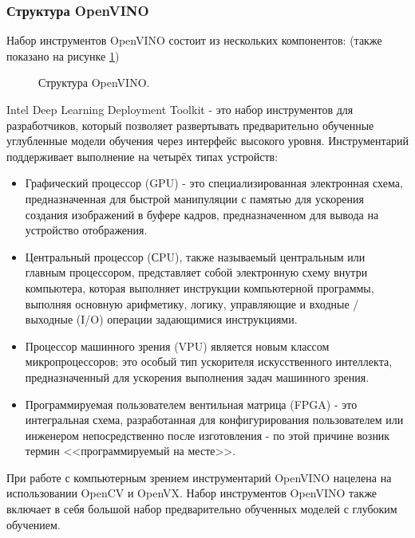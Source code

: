\documentclass[14pt,a4paper]{scrartcl}
\begin{document}
		\subsubsection{Структура OpenVINO}
		
			Набор инструментов OpenVINO состоит из нескольких компонентов: (также показано на рисунке \ref{fig:OpenVINO_Structure})
			
			\begin{figure}[h]
				\caption{Структура OpenVINO.}
				\label{fig:OpenVINO_Structure}
			\end{figure}
			
			Intel Deep Learning Deployment Toolkit - это набор инструментов для разработчиков, который позволяет развертывать предварительно обученные углубленные	модели обучения через интерфейс высокого уровня. Инструментарий поддерживает выполнение на четырёх типах устройств:
			
			\begin{itemize}
				\item Графический процессор (GPU) - это специализированная электронная схема, предназначенная для быстрой манипуляции с памятью для ускорения создания изображений в буфере кадров, предназначенном для вывода на устройство отображения\cite{bib:GPU}.
				\item Центральный процессор (СPU), также называемый центральным или главным процессором, представляет собой электронную схему внутри	компьютера, которая выполняет инструкции компьютерной программы, выполняя основную арифметику, логику, управляющие и входные / выходные (I/O) операции задающимися инструкциями\cite{bib:CPU}.
				\item Процессор машинного зрения (VPU) является новым классом микропроцессоров; это особый тип ускорителя искусственного интеллекта, предназначенный для ускорения выполнения задач машинного зрения\cite{bib:VPU}.
				\item Программируемая пользователем вентильная матрица (FPGA) - это интегральная схема, разработанная для конфигурирования пользователем или	инженером непосредственно после изготовления - по этой причине возник термин <<программируемый на месте>>\cite{bib:FPGA}.
			\end{itemize} 
		
			При работе с компьютерным зрением инструментарий OpenVINO нацелена на использовании OpenCV и OpenVX. Набор инструментов OpenVINO также включает в себя большой набор предварительно обученных моделей с глубоким обучением. 
			
\end{document}
